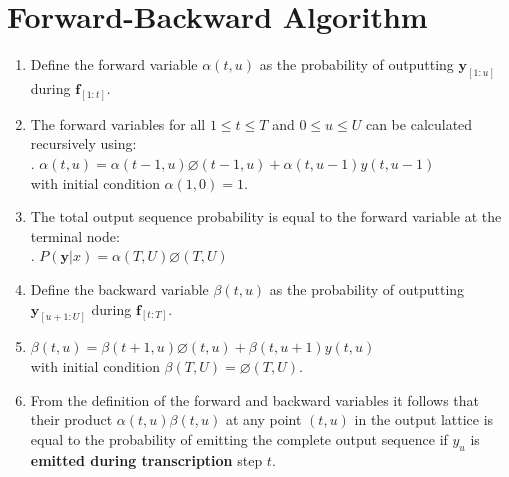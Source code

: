 







\section{Forward-Backward Algorithm}

\begin{enumerate}
    \item Define the forward variable $\alpha(t, u)$ as the probability of outputting $\bm{y}_{[1:u]}$ during $\bm{f}_{[1:t]}$.
    \hfill \cite{arxiv/1211.3711/Sequence-Transduction-RNN}

    \item The forward variables for all $1 \leq t \leq T$ and $0 \leq u \leq U$ can be calculated recursively using:
    \hfill \cite{arxiv/1211.3711/Sequence-Transduction-RNN}
    \\[0.2cm]
    .\hfill
    $\alpha(t, u) = \alpha(t - 1, u)\varnothing(t - 1, u) + \alpha(t, u - 1)y(t, u - 1)$
    \hfill \cite{arxiv/1211.3711/Sequence-Transduction-RNN}
    \\[0.2cm]
    with initial condition $\alpha(1, 0) = 1$.
    \hfill \cite{arxiv/1211.3711/Sequence-Transduction-RNN}

    \item The total output sequence probability is equal to the forward variable at the terminal node:
    \hfill \cite{arxiv/1211.3711/Sequence-Transduction-RNN}
    \\[0.2cm]
    .\hfill
    $P(\bm{y}|x) = \alpha(T, U )\varnothing(T, U )$
    \hfill \cite{arxiv/1211.3711/Sequence-Transduction-RNN}

    \item Define the backward variable $\beta(t, u)$ as the probability of outputting $\bm{y}_{[u+1:U ]}$ during $\bm{f}_{[t:T ]}$.
    \hfill \cite{arxiv/1211.3711/Sequence-Transduction-RNN}

    \item $\beta(t, u) = \beta(t + 1, u)\varnothing(t, u) + \beta(t, u + 1)y(t, u)$
    \hfill \cite{arxiv/1211.3711/Sequence-Transduction-RNN}
    \\[0.2cm]
    with initial condition $\beta(T, U ) = \varnothing(T, U )$. 
    \hfill \cite{arxiv/1211.3711/Sequence-Transduction-RNN}

    \item From the definition of the forward and backward variables it follows that their product $\alpha(t, u)\beta(t, u)$ at any point $(t, u)$ in the output lattice is equal to the probability of emitting the complete output sequence if $y_u$ is \textbf{emitted during transcription} step $t$. 
    \hfill \cite{arxiv/1211.3711/Sequence-Transduction-RNN}
\end{enumerate}


